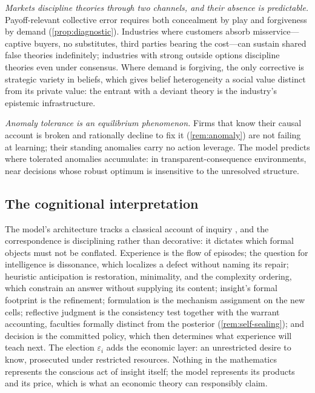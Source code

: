 \emph{Markets discipline theories through two channels, and their absence
is predictable.}  Payoff-relevant collective error requires both concealment
by play and forgiveness by demand (\cref{prop:diagnostic}).  Industries
where customers absorb misservice---captive buyers, no substitutes, third
parties bearing the cost---can sustain shared false theories indefinitely;
industries with strong outside options discipline theories even under
consensus.  Where demand is forgiving, the only corrective is strategic
variety in beliefs, which gives belief heterogeneity a social value distinct
from its private value: the entrant with a deviant theory is the industry's
epistemic infrastructure.

\emph{Anomaly tolerance is an equilibrium phenomenon.}  Firms that know
their causal account is broken and rationally decline to fix it
(\cref{rem:anomaly}) are not failing at learning; their standing anomalies
carry no action leverage.  The model predicts where tolerated anomalies
accumulate: in transparent-consequence environments, near decisions whose
robust optimum is insensitive to the unresolved structure.

\subsection{The cognitional interpretation}

The model's architecture tracks a classical account of inquiry
\citep{Lonergan1992,RyallWilkins2018}, and the correspondence is
disciplining rather than decorative: it dictates which formal objects must
not be conflated.  Experience is the flow of episodes; the question for
intelligence is dissonance, which localizes a defect without naming its
repair; heuristic anticipation is restoration, minimality, and the
complexity ordering, which constrain an answer without supplying its
content; insight's formal footprint is the refinement; formulation is the
mechanism assignment on the new cells; reflective judgment is the
consistency test together with the warrant accounting, faculties formally
distinct from the posterior (\cref{rem:self-sealing}); and decision is the
committed policy, which then determines what experience will teach next.
The election $\varepsilon_i$ adds the economic layer: an unrestricted desire
to know, prosecuted under restricted resources.  Nothing in the mathematics
represents the conscious act of insight itself; the model represents its
products and its price, which is what an economic theory can responsibly
claim.

